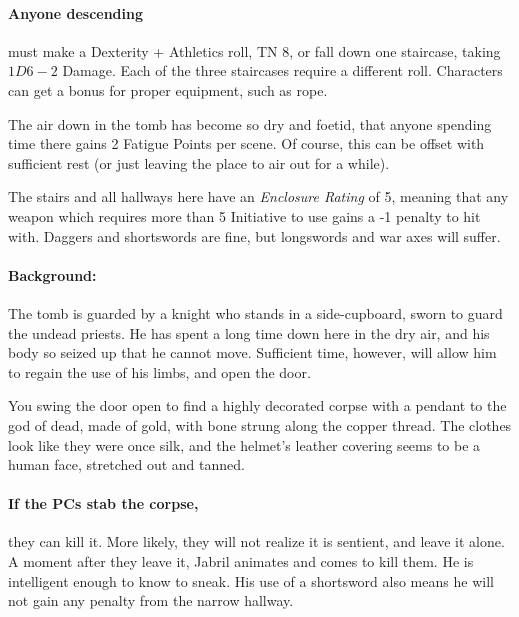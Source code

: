\begin{multicols}{2}
\paragraph{Anyone descending}
must make a Dexterity + Athletics roll, TN 8, or fall down one staircase, taking $1D6-2$ Damage.
Each of the three staircases require a different roll.
Characters can get a bonus for proper equipment, such as rope.

The air down in the tomb has become so dry and foetid, that anyone spending time there gains 2 Fatigue Points per scene.
Of course, this can be offset with sufficient rest (or just leaving the place to air out for a while).

The stairs and all hallways here have an \textit{Enclosure Rating} of 5, meaning that any weapon which requires more than 5 Initiative to use gains a -1 penalty to hit with.
Daggers and shortswords are fine, but longswords and war axes will suffer.


\paragraph{Background:}
The tomb is guarded by a knight who stands in a side-cupboard, sworn to guard the undead priests.
He has spent a long time down here in the dry air, and his body so seized up that he cannot move.
Sufficient time, however, will allow him to regain the use of his limbs, and open the door.

\begin{boxtext}

  You swing the door open to find a highly decorated corpse with a pendant to the god of dead, made of gold, with bone strung along the copper thread.
  The clothes look like they were once silk, and the helmet's leather covering seems to be a human face, stretched out and tanned.

\end{boxtext}

\paragraph{If the PCs stab the corpse,}
they can kill it.
More likely, they will not realize it is sentient, and leave it alone.
A moment after they leave it, Jabril animates and comes to kill them.
He is intelligent enough to know to sneak.
His use of a shortsword also means he will not gain any penalty from the narrow hallway.


\end{multicols}
